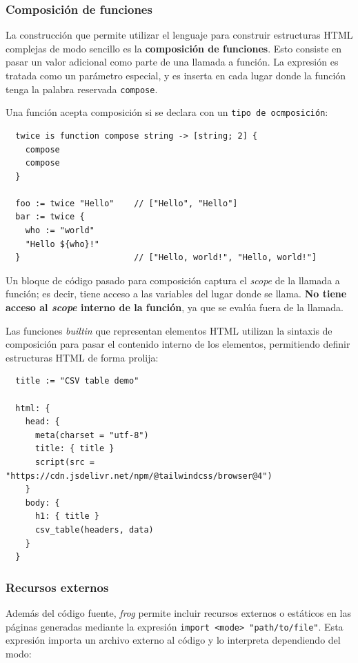 \subsubsection{Composición de funciones}

La construcción que permite utilizar el lenguaje para construir estructuras HTML complejas de modo sencillo es la \textbf{composición de funciones}. Esto consiste en pasar un valor adicional como parte de una llamada a función. La expresión es tratada como un parámetro especial, y es inserta en cada lugar donde la función tenga la palabra reservada \texttt{compose}.

Una función acepta composición si se declara con un \texttt{tipo de ocmposición}:

\small
\begin{verbatim}
  twice is function compose string -> [string; 2] {
    compose
    compose
  }

  foo := twice "Hello"    // ["Hello", "Hello"]
  bar := twice {
    who := "world"
    "Hello ${who}!"
  }                       // ["Hello, world!", "Hello, world!"]
\end{verbatim}
\normalsize

Un bloque de código pasado para composición captura el \textit{scope} de la llamada a función; es decir, tiene acceso a las variables del lugar donde se llama. \textbf{No tiene acceso al \textit{scope} interno de la función}, ya que se evalúa fuera de la llamada.

Las funciones \textit{builtin} que representan elementos HTML utilizan la sintaxis de composición para pasar el contenido interno de los elementos, permitiendo definir estructuras HTML de forma prolija:

\small
\begin{verbatim}
  title := "CSV table demo"

  html: {
    head: {
      meta(charset = "utf-8")
      title: { title }
      script(src = "https://cdn.jsdelivr.net/npm/@tailwindcss/browser@4")
    }
    body: {
      h1: { title }
      csv_table(headers, data)
    }
  }
\end{verbatim}
\normalsize

\subsubsection{Recursos externos}

Además del código fuente, \textit{frog} permite incluir recursos externos o estáticos en las páginas generadas mediante la expresión \texttt{import <mode> "path/to/file"}. Esta expresión importa un archivo externo al código y lo interpreta dependiendo del modo:

